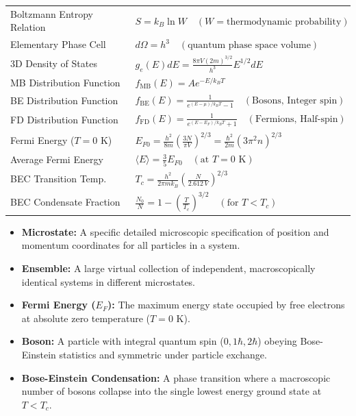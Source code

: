 \documentclass[12pt,a4paper]{article}
\renewcommand{\arraystretch}{1.45}
\begin{document}
\begin{tcolorbox}[formulabox, title={\textbf{Key Formulas and Metrics at a Glance}}]
\renewcommand{\arraystretch}{1.35}
\begin{tabularx}{\linewidth}{B{5.0cm} X}
Boltzmann Entropy Relation & $S = k_B \ln W \quad (W = \text{thermodynamic probability})$ \\[4pt]
Elementary Phase Cell & $d\Omega = h^3 \quad (\text{quantum phase space volume})$ \\[4pt]
3D Density of States & $g_e(E)dE = \frac{8\pi V (2m)^{3/2}}{h^3} E^{1/2} dE$ \\[4pt]
MB Distribution Function & $f_{\text{MB}}(E) = A e^{-E / k_B T}$ \\[4pt]
BE Distribution Function & $f_{\text{BE}}(E) = \frac{1}{e^{(E-\mu)/k_B T} - 1} \quad (\text{Bosons, Integer spin})$ \\[4pt]
FD Distribution Function & $f_{\text{FD}}(E) = \frac{1}{e^{(E-E_F)/k_B T} + 1} \quad (\text{Fermions, Half-spin})$ \\[4pt]
Fermi Energy ($T=0\text{ K}$) & $E_{F0} = \frac{h^2}{8m}\left(\frac{3N}{\pi V}\right)^{2/3} = \frac{\hbar^2}{2m}(3\pi^2 n)^{2/3}$ \\[4pt]
Average Fermi Energy & $\langle E \rangle = \frac{3}{5} E_{F0} \quad (\text{at } T=0\text{ K})$ \\[4pt]
BEC Transition Temp. & $T_c = \frac{h^2}{2\pi m k_B} \left(\frac{N}{2.612 \, V}\right)^{2/3}$ \\[4pt]
BEC Condensate Fraction & $\frac{N_0}{N} = 1 - \left(\frac{T}{T_c}\right)^{3/2} \quad (\text{for } T < T_c)$ \\[4pt]
\end{tabularx}
\end{tcolorbox}

\begin{tcolorbox}[defbox, title={\textbf{One-Line Definitions}}]
\begin{itemize}[leftmargin=*, itemsep=2pt]
  \item \textbf{Microstate:} A specific detailed microscopic specification of position and momentum coordinates for all particles in a system.
  \item \textbf{Ensemble:} A large virtual collection of independent, macroscopically identical systems in different microstates.
  \item \textbf{Fermi Energy ($E_F$):} The maximum energy state occupied by free electrons at absolute zero temperature ($T=0\text{ K}$).
  \item \textbf{Boson:} A particle with integral quantum spin ($0, 1\hbar, 2\hbar$) obeying Bose-Einstein statistics and symmetric under particle exchange.
  \item \textbf{Bose-Einstein Condensation:} A phase transition where a macroscopic number of bosons collapse into the single lowest energy ground state at $T < T_c$.
\end{itemize}
\end{tcolorbox}
\end{document}
